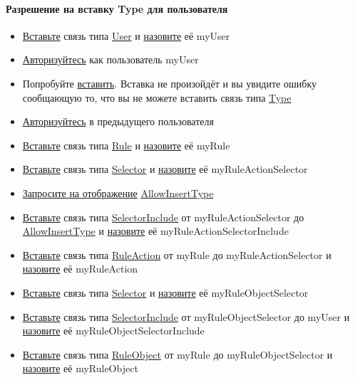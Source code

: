 \paragraph{Разрешение на вставку Type для пользователя}
\begin{itemize}
  \item \hyperlink{DeepCase.InsertLink.Description}{Вставьте} связь типа
  \hyperlink{Core.User.Description}{User} и
  \hyperlink{FAQ.HowToSetName}{назовите} её myUser
  \item \hyperlink{DeepCase.Login.Description}{Авторизуйтесь} как пользователь myUser
  \item Попробуйте \hyperlink{DeepCase.InsertLink.Description}{вставить}. Вставка не произойдёт и вы увидите ошибку сообщающую то, что вы не можете вставить связь типа \hyperlink{Core.Type.Description}{Type}
  \item \hyperlink{DeepCase.Login.Description}{Авторизуйтесь} в предыдущего пользователя
  \item \hyperlink{DeepCase.InsertLink.Description}{Вставьте} связь типа
  \hyperlink{Core.Rule.Description}{Rule} и
  \hyperlink{FAQ.HowToSetName}{назовите} её myRule

  \item \hyperlink{DeepCase.InsertLink.Description}{Вставьте} связь типа
  \hyperlink{Core.Selector.Description}{Selector} и
  \hyperlink{FAQ.HowToSetName}{назовите} её myRuleActionSelector
  \item \hyperlink{Core.Query.Description}{Запросите на отображение} \hyperlink{Core.AllowInsertType.Description}{AllowInsertType}
  \item \hyperlink{DeepCase.InsertLink.Description}{Вставьте} связь типа \hyperlink{Core.SelectorInclude.Description}{SelectorInclude} от myRuleActionSelector до \hyperlink{Core.AllowInsertType.Description}{AllowInsertType} и
  \hyperlink{FAQ.HowToSetName}{назовите} её myRuleActionSelectorInclude
  \item \hyperlink{DeepCase.InsertLink.Description}{Вставьте} связь типа
  \hyperlink{Core.RuleAction.Description}{RuleAction} от myRule до myRuleActionSelector и
  \hyperlink{FAQ.HowToSetName}{назовите} её myRuleAction

  \item \hyperlink{DeepCase.InsertLink.Description}{Вставьте} связь типа
  \hyperlink{Core.Selector.Description}{Selector} и
  \hyperlink{FAQ.HowToSetName}{назовите} её myRuleObjectSelector
  \item \hyperlink{DeepCase.InsertLink.Description}{Вставьте} связь типа \hyperlink{Core.SelectorInclude.Description}{SelectorInclude} от myRuleObjectSelector до myUser и
  \hyperlink{FAQ.HowToSetName}{назовите} её myRuleObjectSelectorInclude
  \item \hyperlink{DeepCase.InsertLink.Description}{Вставьте} связь типа
  \hyperlink{Core.RuleObject.Description}{RuleObject} от myRule до myRuleObjectSelector и
  \hyperlink{FAQ.HowToSetName}{назовите} её myRuleObject


\end{itemize}

